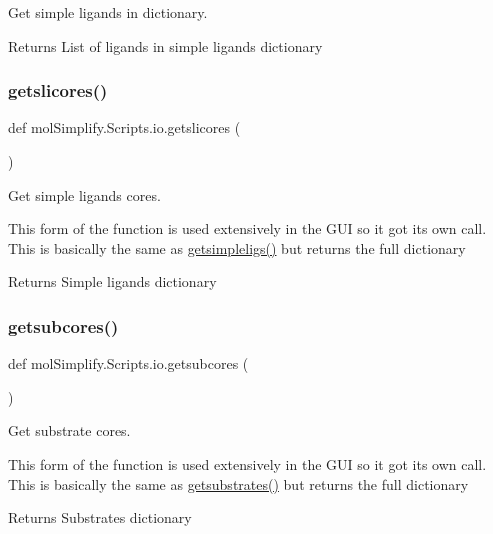Get simple ligands in dictionary. 

\begin{DoxyReturn}{Returns}
List of ligands in simple ligands dictionary 
\end{DoxyReturn}
\mbox{\label{namespacemolSimplify_1_1Scripts_1_1io_a1207fa1422beb3ec6f879ebeeef7096f}} 
\subsubsection{\texorpdfstring{getslicores()}{getslicores()}}
{\footnotesize\ttfamily def mol\+Simplify.\+Scripts.\+io.\+getslicores (\begin{DoxyParamCaption}{ }\end{DoxyParamCaption})}



Get simple ligands cores. 

This form of the function is used extensively in the G\+UI so it got it\textquotesingle{}s own call. This is basically the same as \hyperlink{namespacemolSimplify_1_1Scripts_1_1io_a78464c05e4823eb46028f344815c80c5}{getsimpleligs()} but returns the full dictionary \begin{DoxyReturn}{Returns}
Simple ligands dictionary 
\end{DoxyReturn}
\mbox{\label{namespacemolSimplify_1_1Scripts_1_1io_a737fb5f3188826264d70c1005c4ca6f0}} 
\subsubsection{\texorpdfstring{getsubcores()}{getsubcores()}}
{\footnotesize\ttfamily def mol\+Simplify.\+Scripts.\+io.\+getsubcores (\begin{DoxyParamCaption}{ }\end{DoxyParamCaption})}



Get substrate cores. 

This form of the function is used extensively in the G\+UI so it got it\textquotesingle{}s own call. This is basically the same as \hyperlink{namespacemolSimplify_1_1Scripts_1_1io_aacb8edd728a1907336e0201ec232446f}{getsubstrates()} but returns the full dictionary \begin{DoxyReturn}{Returns}
Substrates dictionary 
\end{DoxyReturn}
\mbox{\label{namespacemolSimplify_1_1Scripts_1_1io_aacb8edd728a1907336e0201ec232446f}} 
